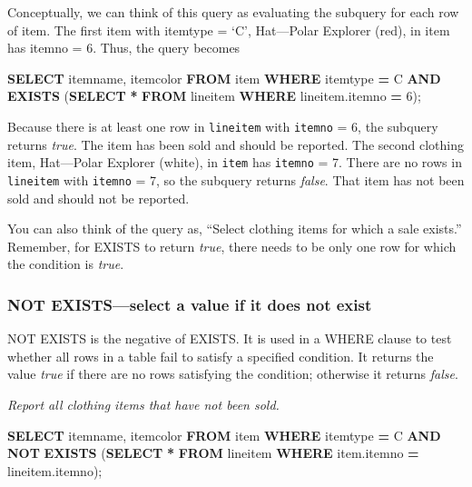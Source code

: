\documentclass[
]{article}
\newenvironment{Shaded}{\begin{snugshade}}{\end{snugshade}}
\newcommand{\DecValTok}[1]{\textcolor[rgb]{0.00,0.00,0.81}{#1}}
\newcommand{\KeywordTok}[1]{\textcolor[rgb]{0.13,0.29,0.53}{\textbf{#1}}}
\newcommand{\NormalTok}[1]{#1}
\newcommand{\OperatorTok}[1]{\textcolor[rgb]{0.81,0.36,0.00}{\textbf{#1}}}
\newcommand{\StringTok}[1]{\textcolor[rgb]{0.31,0.60,0.02}{#1}}
\begin{document}
Conceptually, we can think of this query as evaluating the subquery for
each row of item. The first item with itemtype = `C', Hat---Polar
Explorer (red), in item has itemno = 6. Thus, the query becomes

\begin{Shaded}
\begin{Highlighting}[]
\KeywordTok{SELECT}\NormalTok{ itemname, itemcolor }\KeywordTok{FROM}\NormalTok{ item}
    \KeywordTok{WHERE}\NormalTok{ itemtype }\OperatorTok{=} \StringTok{\textquotesingle{}C\textquotesingle{}}
    \KeywordTok{AND} \KeywordTok{EXISTS}\NormalTok{ (}\KeywordTok{SELECT} \OperatorTok{*} \KeywordTok{FROM}\NormalTok{ lineitem}
        \KeywordTok{WHERE}\NormalTok{ lineitem.itemno }\OperatorTok{=} \DecValTok{6}\NormalTok{);}
\end{Highlighting}
\end{Shaded}

Because there is at least one row in \texttt{lineitem} with
\texttt{itemno} = 6, the subquery returns \emph{true}. The item has been
sold and should be reported. The second clothing item, Hat---Polar
Explorer (white), in \texttt{item} has \texttt{itemno} = 7. There are no
rows in \texttt{lineitem} with \texttt{itemno} = 7, so the subquery
returns \emph{false}. That item has not been sold and should not be
reported.

You can also think of the query as, ``Select clothing items for which a
sale exists.'' Remember, for EXISTS to return \emph{true}, there needs
to be only one row for which the condition is \emph{true}.

\hypertarget{not-existsselect-a-value-if-it-does-not-exist}{%
\subsubsection{NOT EXISTS---select a value if it does not
exist}\label{not-existsselect-a-value-if-it-does-not-exist}}

NOT EXISTS is the negative of EXISTS. It is used in a WHERE clause to
test whether all rows in a table fail to satisfy a specified condition.
It returns the value \emph{true} if there are no rows satisfying the
condition; otherwise it returns \emph{false}.

\emph{Report all clothing items that have not been sold.}

\begin{Shaded}
\begin{Highlighting}[]
\KeywordTok{SELECT}\NormalTok{ itemname, itemcolor }\KeywordTok{FROM}\NormalTok{ item}
    \KeywordTok{WHERE}\NormalTok{ itemtype }\OperatorTok{=} \StringTok{\textquotesingle{}C\textquotesingle{}}
    \KeywordTok{AND} \KeywordTok{NOT} \KeywordTok{EXISTS}
\NormalTok{        (}\KeywordTok{SELECT} \OperatorTok{*} \KeywordTok{FROM}\NormalTok{ lineitem}
            \KeywordTok{WHERE}\NormalTok{ item.itemno }\OperatorTok{=}\NormalTok{ lineitem.itemno);}
\end{Highlighting}
\end{Shaded}
\end{document}
